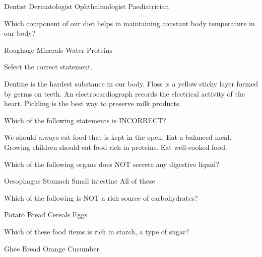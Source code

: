 \begin{randomizeoneparchoices}
    \choice Dentist
    \CorrectChoice Dermatologist
    \choice Ophthalmologist
    \choice Paediatrician
\end{randomizeoneparchoices}

\question Which component of our diet helps in maintaining constant body temperature in our body?

\begin{randomizeoneparchoices}
    \choice Roughage
    \choice Minerals
    \CorrectChoice Water
    \choice Proteins
\end{randomizeoneparchoices}

\question Select the correct statement.

\begin{randomizechoices}
    \choice Dentine is the hardest substance in our body.
    \choice Floss is a yellow sticky layer formed by germs on teeth.
    \CorrectChoice An electrocardiograph records the electrical activity of the heart.
    \choice Pickling is the best way to preserve milk products.
\end{randomizechoices}

\question Which of the following statements is INCORRECT?

\begin{randomizechoices}
    \CorrectChoice We should always eat food that is kept in the open.
    \choice Eat a balanced meal.
    \choice Growing children should eat food rich in proteins.
    \choice Eat well-cooked food.
\end{randomizechoices}

\question Which of the following organs does NOT secrete any digestive liquid?

\begin{randomizeoneparchoices}
    \CorrectChoice Oesophagus
    \choice Stomach
    \choice Small intestine
    \choice All of these
\end{randomizeoneparchoices}

\question Which of the following is NOT a rich source of carbohydrates?

\begin{randomizeoneparchoices}
    \choice Potato
    \choice Bread
    \choice Cereals
    \CorrectChoice Eggs
\end{randomizeoneparchoices}

\question Which of these food items is rich in starch, a type of sugar?

\begin{randomizeoneparchoices}
    \choice Ghee
    \CorrectChoice Bread
    \choice Orange
    \choice Cucumber
\end{randomizeoneparchoices}

